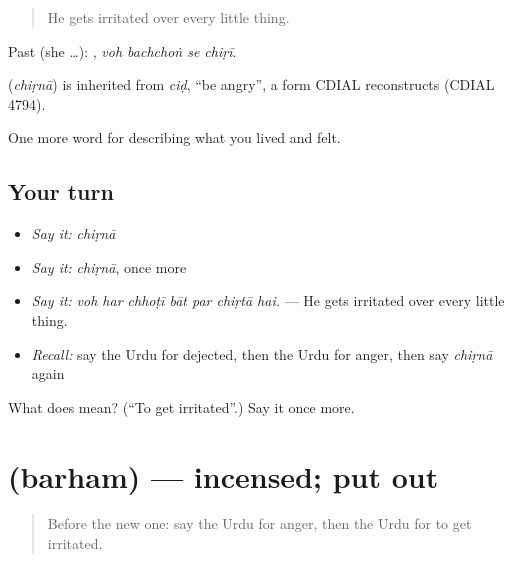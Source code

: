 \begin{quote}
He gets irritated over every little thing.
\end{quote}

Past (she …):    , \emph{voh bachchoṅ se chiṛī}.

\begin{cousinweb}
\textbf{} (\emph{chiṛnā}) is inherited from \emph{ciḍ}, \textquotedblleft{}be angry\textquotedblright{}, a form CDIAL reconstructs (CDIAL 4794).
\end{cousinweb}

\begin{grammarlens}[title={What you've built}]
One more word for describing what you lived and felt.
\end{grammarlens}

\subsection*{Your turn}
\begin{itemize}
\raggedright
  \item \emph{Say it:} \emph{chiṛnā}
  \item \emph{Say it:} \emph{chiṛnā}, once more
  \item \emph{Say it:} \emph{voh har chhoṭī bāt par chiṛtā hai.} — He gets irritated over every little thing.
  \item \emph{Recall:} say the Urdu for dejected, then the Urdu for anger, then say \emph{chiṛnā} again
\end{itemize}

\begin{tcolorbox}[breakable,colback=teal!4,colframe=teal!35!black,title={Before you move on}]
What does  mean? (\textquotedblleft{}To get irritated\textquotedblright{}.) Say it once more.
\end{tcolorbox}
\section[\texorpdfstring{\ur{برہم} (barham)}{برہم (barham)}]{ (barham) — incensed; put out}

\label{lesson:UR-C444-barham}



\begin{quote}
Before the new one: say the Urdu for anger, then the Urdu for to get irritated.
\end{quote}

